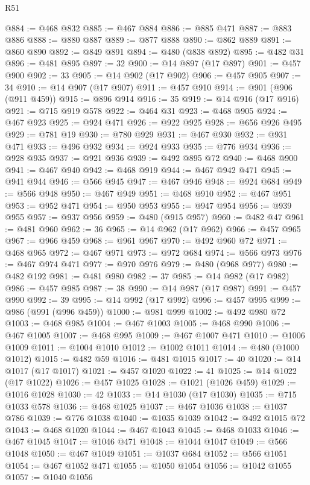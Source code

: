 \begin{lexlean}{R51}
\begin{coremodule}
@884 := @468 @832
@885 := @467 @884
@886 := @885 @471
@887 := @883 @886
@888 := @880 @887
@889 := @877 @888
@890 := @862 @889
@891 := @860 @890
@892 := @849 @891
@894 := @480 (@838 @892)
@895 := @482 @31
@896 := @481 @895
@897 := 32
@900 := @14 @897 (@17 @897)
@901 := @457 @900
@902 := 33
@905 := @14 @902 (@17 @902)
@906 := @457 @905
@907 := 34
@910 := @14 @907 (@17 @907)
@911 := @457 @910
@914 := @901 (@906 (@911 @459))
@915 := @896 @914
@916 := 35
@919 := @14 @916 (@17 @916)
@921 := @715 @919 @578
@922 := @464 @31
@923 := @468 @905
@924 := @467 @923
@925 := @924 @471
@926 := @922 @925
@928 := @656 @926 @495
@929 := @781 @19
@930 := @780 @929
@931 := @467 @930
@932 := @931 @471
@933 := @496 @932
@934 := @924 @933
@935 := @776 @934
@936 := @928 @935
@937 := @921 @936
@939 := @492 @895 @72
@940 := @468 @900
@941 := @467 @940
@942 := @468 @919
@944 := @467 @942 @471
@945 := @941 @944
@946 := @566 @945
@947 := @467 @946
@948 := @924 @684
@949 := @566 @948
@950 := @467 @949
@951 := @468 @910
@952 := @467 @951
@953 := @952 @471
@954 := @950 @953
@955 := @947 @954
@956 := @939 @955
@957 := @937 @956
@959 := @480 (@915 @957)
@960 := @482 @47
@961 := @481 @960
@962 := 36
@965 := @14 @962 (@17 @962)
@966 := @457 @965
@967 := @966 @459
@968 := @961 @967
@970 := @492 @960 @72
@971 := @468 @965
@972 := @467 @971
@973 := @972 @684
@974 := @566 @973
@976 := @467 @974 @471
@977 := @970 @976
@979 := @480 (@968 @977)
@980 := @482 @192
@981 := @481 @980
@982 := 37
@985 := @14 @982 (@17 @982)
@986 := @457 @985
@987 := 38
@990 := @14 @987 (@17 @987)
@991 := @457 @990
@992 := 39
@995 := @14 @992 (@17 @992)
@996 := @457 @995
@999 := @986 (@991 (@996 @459))
@1000 := @981 @999
@1002 := @492 @980 @72
@1003 := @468 @985
@1004 := @467 @1003
@1005 := @468 @990
@1006 := @467 @1005
@1007 := @468 @995
@1009 := @467 @1007 @471
@1010 := @1006 @1009
@1011 := @1004 @1010
@1012 := @1002 @1011
@1014 := @480 (@1000 @1012)
@1015 := @482 @59
@1016 := @481 @1015
@1017 := 40
@1020 := @14 @1017 (@17 @1017)
@1021 := @457 @1020
@1022 := 41
@1025 := @14 @1022 (@17 @1022)
@1026 := @457 @1025
@1028 := @1021 (@1026 @459)
@1029 := @1016 @1028
@1030 := 42
@1033 := @14 @1030 (@17 @1030)
@1035 := @715 @1033 @578
@1036 := @468 @1025
@1037 := @467 @1036
@1038 := @1037 @786
@1039 := @776 @1038
@1040 := @1035 @1039
@1042 := @492 @1015 @72
@1043 := @468 @1020
@1044 := @467 @1043
@1045 := @468 @1033
@1046 := @467 @1045
@1047 := @1046 @471
@1048 := @1044 @1047
@1049 := @566 @1048
@1050 := @467 @1049
@1051 := @1037 @684
@1052 := @566 @1051
@1054 := @467 @1052 @471
@1055 := @1050 @1054
@1056 := @1042 @1055
@1057 := @1040 @1056

\end{coremodule}
\end{lexlean}
